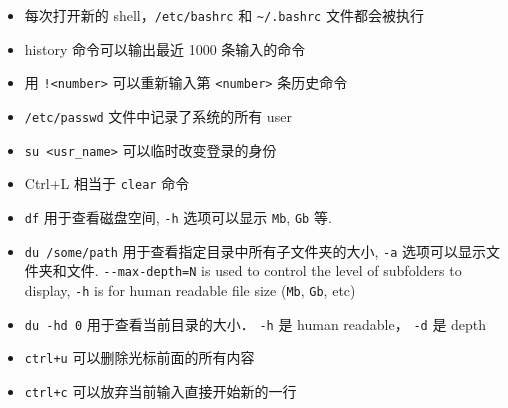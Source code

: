\begin{itemize}
\item 每次打开新的 shell，\verb`/etc/bashrc` 和 \verb`~/.bashrc` 文件都会被执行
\item history 命令可以输出最近 1000 条输入的命令
\item 用 \verb`!<number>` 可以重新输入第 \verb`<number>` 条历史命令
\item \verb`/etc/passwd` 文件中记录了系统的所有 user
\item \verb`su <usr_name>` 可以临时改变登录的身份
\item Ctrl+L 相当于 \verb`clear` 命令
\item \verb`df` 用于查看磁盘空间, \verb`-h` 选项可以显示 \verb`Mb`, \verb`Gb` 等.
\item \verb`du /some/path` 用于查看指定目录中所有子文件夹的大小, \verb`-a` 选项可以显示文件夹和文件. \verb`--max-depth=N` is used to control the level of subfolders to display, \verb`-h` is for human readable file size (\verb`Mb`, \verb`Gb`, etc)
\item \verb|du -hd 0| 用于查看当前目录的大小． \verb|-h| 是 human readable， \verb|-d| 是 depth
\item \verb`ctrl+u` 可以删除光标前面的所有内容
\item \verb`ctrl+c` 可以放弃当前输入直接开始新的一行
\end{itemize}


